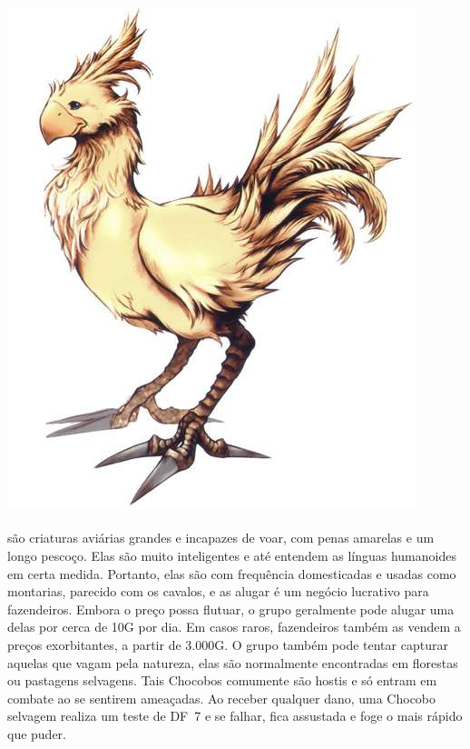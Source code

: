 %

\\\\
%
\includegraphics[width=0.95\columnwidth]{./art/chocobo/chocobo.jpg}
%
\\\\
%
%
 são criaturas aviárias grandes e incapazes de voar, com penas amarelas e um longo pescoço. Elas são muito inteligentes e até entendem as línguas humanoides em certa medida.
Portanto, elas são com frequência domesticadas e usadas como montarias, parecido com os cavalos, e as alugar é um negócio lucrativo para fazendeiros.
Embora o preço possa flutuar, o grupo geralmente pode alugar uma delas por cerca de 10G por dia.
Em casos raros, fazendeiros também as vendem a preços exorbitantes, a partir de 3.000G.
O grupo também pode tentar capturar aquelas que vagam pela natureza, elas são normalmente encontradas em florestas ou pastagens selvagens.
Tais Chocobos comumente são hostis e só entram em combate ao se sentirem ameaçadas.
Ao receber qualquer dano, uma Chocobo selvagem realiza um teste de DF~7 e se falhar, fica assustada e foge o mais rápido que puder.
